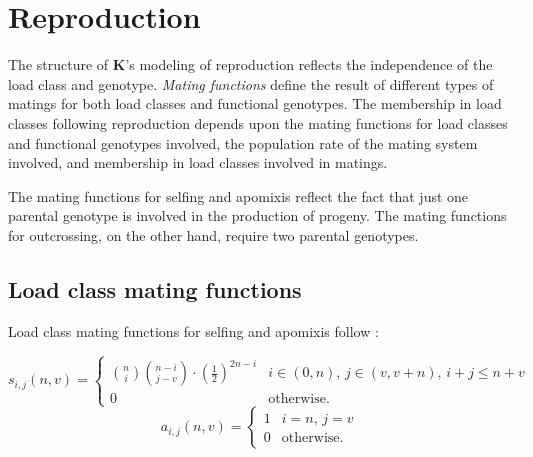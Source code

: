 \documentclass[12pt,twoside,letterpaper,fleqn]{report}
\numberwithin{equation}{section}  %
\newcommand{\K}{{\bf K}}
\newcommand{\funcself}{\mbox{$s_{i,j}(n,v)$}}
\newcommand{\funcapomixis}{\mbox{$a_{i,j}(n,v)$}}
\begin{document}
{%
\chapter{Reproduction}
\label{chapter:Kreproduction}

The structure of \K's modeling of reproduction reflects the independence of the
load class and genotype.  {\em Mating functions} define the result of different
types of matings for both load classes and functional genotypes.  The
membership in load classes following reproduction depends upon the mating
functions for load classes and functional genotypes involved, the population
rate of the mating system involved, and membership in load classes involved in
matings.

The mating functions for selfing and apomixis reflect the fact that just one
parental genotype is involved in the production of progeny.  The mating
functions for outcrossing, on the other hand, require two parental genotypes.

\section{Load class mating functions}

Load class mating functions for selfing and apomixis follow
\citet{Kondrashov:1985:5375}:

\begin{equation}
\label{eq:Kreproduction:s}
\funcself =
    \begin{cases}
        \binom{n}{i}\binom{n-i}{j-v}\cdot\left({\frac{1}{2}}\right)^{2n-i} & \text{$i\in(0,n)$, $j\in(v,v + n)$, $i+j \leq n+v$} \\
        0                                                                  & \text{otherwise.} 
    \end{cases}
\end{equation}
\begin{equation}
\label{eq:Kreproduction:a}
\funcapomixis = 
    \begin{cases}
        1  &  \text{$i=n$, $j=v$} \\
        0  &  \text{otherwise.}  
    \end{cases}
\end{equation}

}
\end{document}

